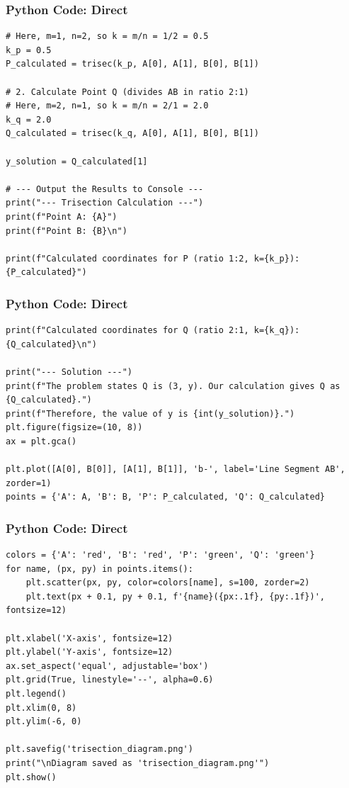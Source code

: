 \documentclass{beamer}
\begin{document}
\begin{frame}[fragile]
\frametitle{Python Code: Direct}
\begin{lstlisting}
# Here, m=1, n=2, so k = m/n = 1/2 = 0.5
k_p = 0.5
P_calculated = trisec(k_p, A[0], A[1], B[0], B[1])

# 2. Calculate Point Q (divides AB in ratio 2:1)
# Here, m=2, n=1, so k = m/n = 2/1 = 2.0
k_q = 2.0
Q_calculated = trisec(k_q, A[0], A[1], B[0], B[1])

y_solution = Q_calculated[1]

# --- Output the Results to Console ---
print("--- Trisection Calculation ---")
print(f"Point A: {A}")
print(f"Point B: {B}\n")

print(f"Calculated coordinates for P (ratio 1:2, k={k_p}): {P_calculated}")
\end{lstlisting}
\end{frame}

\begin{frame}[fragile]
\frametitle{Python Code: Direct}
\begin{lstlisting}
print(f"Calculated coordinates for Q (ratio 2:1, k={k_q}): {Q_calculated}\n")

print("--- Solution ---")
print(f"The problem states Q is (3, y). Our calculation gives Q as {Q_calculated}.")
print(f"Therefore, the value of y is {int(y_solution)}.")
plt.figure(figsize=(10, 8))
ax = plt.gca()

plt.plot([A[0], B[0]], [A[1], B[1]], 'b-', label='Line Segment AB', zorder=1)
points = {'A': A, 'B': B, 'P': P_calculated, 'Q': Q_calculated}
\end{lstlisting}
\end{frame}

\begin{frame}[fragile]
\frametitle{Python Code: Direct}
\begin{lstlisting}
colors = {'A': 'red', 'B': 'red', 'P': 'green', 'Q': 'green'}
for name, (px, py) in points.items():
    plt.scatter(px, py, color=colors[name], s=100, zorder=2)
    plt.text(px + 0.1, py + 0.1, f'{name}({px:.1f}, {py:.1f})', fontsize=12)

plt.xlabel('X-axis', fontsize=12)
plt.ylabel('Y-axis', fontsize=12)
ax.set_aspect('equal', adjustable='box')
plt.grid(True, linestyle='--', alpha=0.6)
plt.legend()
plt.xlim(0, 8)
plt.ylim(-6, 0)

plt.savefig('trisection_diagram.png')
print("\nDiagram saved as 'trisection_diagram.png'")
plt.show()

\end{lstlisting}
\end{frame}
\end{document}
